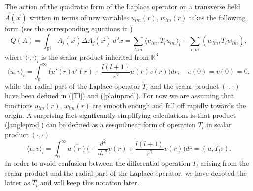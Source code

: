 \documentclass[12pt]{article}
\newcommand{\ol}{\overline}
\newcommand{\RR}{\mathbb{R}}
\begin{document}
    The action of the quadratic form of the Laplace operator on a transverse
    field
$ \vec{A}(\vec{x}) $
	written in terms of new variables
$ u_{lm}(r) $,
$ w_{lm}(r) $
	takes the following form (see the corresponding equations in
\cite{Lapl})
\begin{equation*}
        Q(A) = \int_{\RR^{3}} A_{j}(\vec{x}) \Delta A_{j}(\vec{x}) \, d^{3}x 
	= \sum_{l,m}\langle u_{lm},\check{T}_{l}u_{lm}\rangle_{l}
	    + \sum_{l,m}(w_{lm},\check{T}_{l}w_{lm}) ,
\end{equation*}
	where
$ \langle \cdot , \cdot \rangle_{l} $
	is the scalar product inherited from 
$ \RR^{3} $
\begin{equation}
\label{angleprod}
    \langle u, v\rangle_{l} = \int_{0}^{\infty} \bigl(
	\ol{u'(r)}v'(r) + \frac{l(l+1)}{r^{2}} \ol{u(r)}v(r)\bigr) dr ,
    \quad u(0) = v(0) = 0,
\end{equation}
	while the radial part of the Laplace operator
$ \check{T}_{l} $
	and the scalar product
$ (\cdot,\cdot) $
	have been defined in
(\ref{Tl}) and
(\ref{plainprod}).
	For now we are assuming that functions
$ u_{lm}(r) $,
$ w_{lm}(r) $
	are smooth enough and fall off rapidly towards the origin.
	A surprising fact significantly simplifying calculations is that
	product
(\ref{angleprod})
	can be defined as a sesquilinear form of operation
$ T_{l} $
	in scalar product
$ (\cdot,\cdot) $
\begin{equation}
\label{Tprod}
    \langle u,v\rangle_{l} = \int_{0}^{\infty} \ol{u(r)} \bigl(
	-\frac{d^{2}}{dr^{2}}v(r) + \frac{l(l+1)}{r^{2}}v(r) \bigr) dr
	= (u, T_{l}v).
\end{equation}
	In order to avoid confusion between the differential operation
$ T_{l} $
	arising from the scalar product and the radial part of the
    Laplace operator,
	we have denoted the latter as
$ \check{T}_{l} $
	and will keep this notation later.
\end{document}
